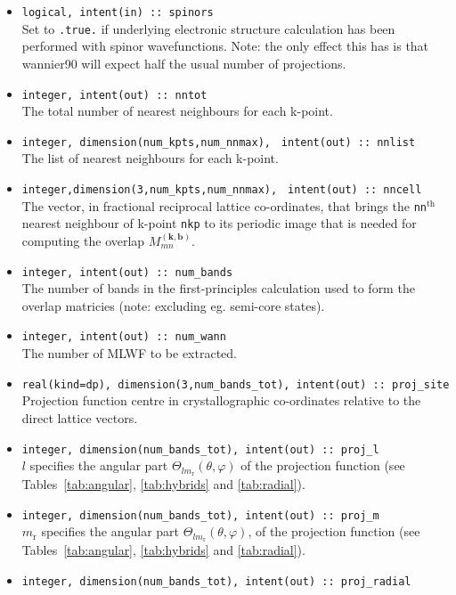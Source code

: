 \begin{itemize}
\item \verb#logical, intent(in) :: spinors#\\ Set to \texttt{.true.} if
  underlying electronic structure calculation has been performed with
  spinor wavefunctions. Note: the only effect this has is that wannier90
  will expect half the usual number of projections.
\item \verb#integer, intent(out) :: nntot#\\ The
  total number of nearest neighbours for each k-point. 
\item \verb#integer, dimension(num_kpts,num_nnmax),#
      \verb# intent(out) :: nnlist#\\
      The list of nearest neighbours for each k-point.
\item \verb#integer,dimension(3,num_kpts,num_nnmax),#
      \verb# intent(out) :: nncell#\\ 
      The vector, in fractional reciprocal lattice co-ordinates, that
      brings the \verb#nn#$^{\mathrm{th}}$ nearest neighbour of
      k-point \verb#nkp# to its periodic image that
      is needed for computing the overlap 
      $M_{mn}^{(\mathbf{k,b})}$.
\item \verb#integer, intent(out) :: num_bands#\\ The number of bands in the
first-principles calculation used to form the overlap matricies (note: excluding eg. semi-core states).
\item \verb#integer, intent(out) :: num_wann#\\ The number of MLWF
  to be extracted.
\item  \verb#real(kind=dp), dimension(3,num_bands_tot), intent(out) :: proj_site# \\
Projection function centre
in crystallographic co-ordinates relative to the direct lattice
vectors.
\item \verb#integer, dimension(num_bands_tot), intent(out) :: proj_l#\\
 $l$  specifies the angular part $\Theta_{lm_{\mathrm{r}}}(\theta,\varphi)$ of the
projection function  (see Tables~\ref{tab:angular}, \ref{tab:hybrids}
and \ref{tab:radial}). 
\item \verb#integer, dimension(num_bands_tot), intent(out) :: proj_m#\\
 $m_\mathrm{r}$ specifies the angular part $\Theta_{lm_{\mathrm{r}}}(\theta,\varphi)$, of the
projection function
 (see Tables~\ref{tab:angular}, \ref{tab:hybrids}
and \ref{tab:radial}). 
\item \verb#integer, dimension(num_bands_tot), intent(out) :: proj_radial#\\

\end{itemize}
